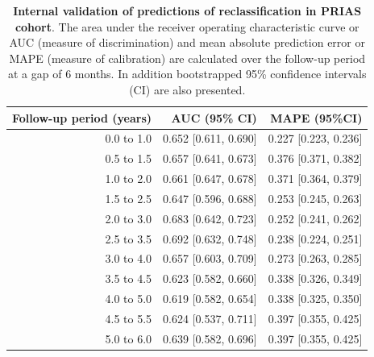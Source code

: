 \begin{table}[!htb]
\small\sf\centering
\caption{\textbf{Internal validation of predictions of reclassification in PRIAS cohort}. The area under the receiver operating characteristic curve or AUC (measure of discrimination) and mean absolute prediction error or MAPE (measure of calibration) are calculated over the follow-up period at a gap of 6 months. In addition bootstrapped 95\% confidence intervals (CI) are also presented.}
\label{tab:AUC_PE_PRIAS}
\begin{tabular}{r|r|r}
\hline
\hline
Follow-up period (years) & AUC (95\% CI) & MAPE (95\%CI)\\ 
\hline
0.0 to 1.0 & 0.652 [0.611, 0.690] & 0.227 [0.223, 0.236]\\
0.5 to 1.5 & 0.657 [0.641, 0.673] & 0.376 [0.371, 0.382]\\
1.0 to 2.0 & 0.661 [0.647, 0.678] & 0.371 [0.364, 0.379]\\
1.5 to 2.5 & 0.647 [0.596, 0.688] & 0.253 [0.245, 0.263]\\
2.0 to 3.0 & 0.683 [0.642, 0.723] & 0.252 [0.241, 0.262]\\
2.5 to 3.5 & 0.692 [0.632, 0.748] & 0.238 [0.224, 0.251]\\
3.0 to 4.0 & 0.657 [0.603, 0.709] & 0.273 [0.263, 0.285]\\
3.5 to 4.5 & 0.623 [0.582, 0.660] & 0.338 [0.326, 0.349]\\
4.0 to 5.0 & 0.619 [0.582, 0.654] & 0.338 [0.325, 0.350]\\
4.5 to 5.5 & 0.624 [0.537, 0.711] & 0.397 [0.355, 0.425]\\
5.0 to 6.0 & 0.639 [0.582, 0.696] & 0.397 [0.355, 0.425]\\
\hline
\end{tabular}	
\end{table}

